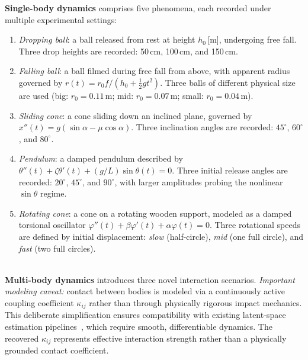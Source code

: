 \documentclass[runningheads]{llncs}
\begin{document}
\noindent
\textbf{Single-body dynamics} comprises five phenomena, each recorded under multiple experimental settings:
\begin{enumerate}
    \item \emph{Dropping ball}: a ball released from rest at height $h_0$\,[m], undergoing free fall. Three drop heights are recorded: 50\,cm, 100\,cm, and 150\,cm.
    \item \emph{Falling ball}: a ball filmed during free fall from above, with apparent radius governed by $r(t) = r_0 f / (h_0 + \tfrac{1}{2}g t^2)$. Three balls of different physical size are used (big: $r_0 = 0.11$\,m; mid: $r_0 = 0.07$\,m; small: $r_0 = 0.04$\,m).
    \item \emph{Sliding cone}: a cone sliding down an inclined plane, governed by $x''(t) = g(\sin\alpha - \mu\cos\alpha)$. Three inclination angles are recorded: $45^\circ$, $60^\circ$, and $80^\circ$.
    \item \emph{Pendulum}: a damped pendulum described by $\theta''(t) + \zeta\theta'(t) + (g/L)\sin\theta(t) = 0$. Three initial release angles are recorded: $20^\circ$, $45^\circ$, and $90^\circ$, with larger amplitudes probing the nonlinear $\sin\theta$ regime.
    \item \emph{Rotating cone}: a cone on a rotating wooden support, modeled as a damped torsional oscillator $\varphi''(t) + \beta\varphi'(t) + \alpha\varphi(t) = 0$. Three rotational speeds are defined by initial displacement: \emph{slow} (half-circle), \emph{mid} (one full circle), and \emph{fast} (two full circles).
\end{enumerate}
\\
\noindent
\textbf{Multi-body dynamics} introduces three novel interaction scenarios. \emph{Important modeling caveat:} contact between bodies is modeled via a continuously active coupling coefficient $\kappa_{ij}$ rather than through physically rigorous impact mechanics. This deliberate simplification ensures compatibility with existing latent-space estimation pipelines~\cite{hofherr2023neural, jaques2019physics, garcia2025learning}, which require smooth, differentiable dynamics. The recovered $\kappa_{ij}$ represents effective interaction strength rather than a physically grounded contact coefficient.
\end{document}
